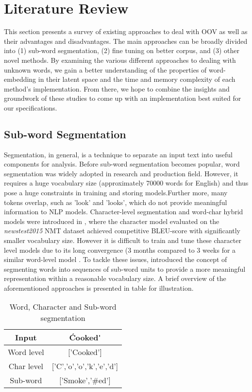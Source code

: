 

\chapter{Literature Review}

This section presents a survey of existing approaches to deal with OOV as well as their advantages and disadvantages. The main approaches can be broadly divided into (1) sub-word segmentation, (2) fine tuning on better corpus, and (3) other novel methods. By examining the various different approaches to dealing with unknown words, we gain a better understanding of the properties of word-embedding in their latent space and the time and memory complexity of each method's implementation. From there, we hope to combine the insights and groundwork of these studies to come up with an implementation best suited for our specifications. 

\section{Sub-word Segmentation}

Segmentation, in general, is a technique to separate an input text into useful components for analysis. Before sub-word segmentation becomes popular, word segmentation was widely adopted in research and production field. However, it requires a huge vocabulary size (approximately 70000 words for English) and thus pose a huge constraints in training and storing models.Further more, many tokens overlap, such as 'look' and 'looks', which do not provide meaningful information to NLP models. Character-level segmentation and word-char hybrid models were introduced in \cite{DBLP:journals/corr/LuongM16}, where the character model evaluated on the \emph{newstest2015} NMT dataset achieved competitive BLEU-score with significantly smaller vocabulary size. However it is difficult to train and tune these character level models due to its long convergence (3 months compared to 3 weeks for a similar word-level model \cite{DBLP:journals/corr/LuongM16}. To tackle these issues, \cite{sennrich-etal-2016-neural} introduced the concept of segmenting words into sequences of sub-word units to provide a more meaningful representation within a reasonable vocabulary size. A brief overview of the aforementioned approaches is presented in table  for illustration.

\begin{table}
	\centering
	\begin{tabular}{cc}\toprule
		Input  & \'Cooked\' \\\midrule
		Word level & ['Cooked']\\
		Char level & ['C','o','o','k','e','d']\\
		Sub-word   & ['Smoke','\#ed']\\
		\bottomrule
	\end{tabular}
	\caption{Word, Character and Sub-word segmentation}
	\label{tab:segmentation}
\end{table}

